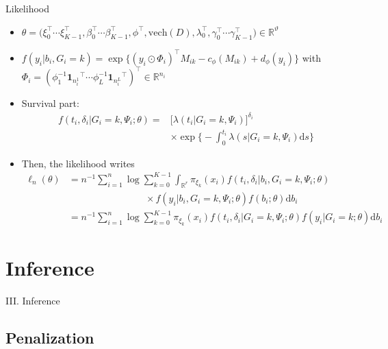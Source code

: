 \documentclass{beamer}
\newcommand{\dd}{\mathrm{d}}
\newcommand{\R}{\mathbb R}
\begin{document}
\begin{frame}{Likelihood}

\footnotesize
\begin{itemize}
  \item<1-> \scriptsize $\theta = \big(\xi_0^\top \cdots \xi_{K-1}^\top, \beta_0^\top \cdots \beta_{K-1}^\top, \phi^\top, \text{vech}(D), \lambda_0^\top, \gamma_0^\top \cdots \gamma_{K-1}^\top\big) \in \R^\vartheta$
  \item<2-> $f(y_i|b_i, G_i=k) = \exp \big\{(y_i \odot \Phi_i)^\top M_{ik} - c_\phi(M_{ik}) + d_\phi(y_i) \big\}$ with $\Phi_i = (\phi_1^{-1} {\textbf{1}_{n_i^1}}^\top \cdots \phi_L^{-1} {\textbf{1}_{n_i^L}}^\top)^\top \in \R^{n_i}$
  \item<3-> Survival part:
  \begin{align*}f(t_i, \delta_i| G_i = k, \Psi_i ; \theta) = &\big[\lambda(t_i| G_i = k, \Psi_i)\big]^{\delta_i} \\ & \times \exp \Big\{-\int_0^{t_i} \lambda(s| G_i = k, \Psi_i) \dd s \Big\}
  \end{align*}
  \item<4-> Then, the likelihood writes
  \begin{align*}
  \ell_n(\theta) &= n^{-1} \sum_{i=1}^n \log \sum_{k=0}^{K-1} \int_{\R^r} \pi_{\xi_k}(x_i) f(t_i, \delta_i| b_i, G_i = k, \Psi_i ; \theta) \\ & \qquad\qquad\qquad\qquad \times f(y_i | b_i, G_i = k, \Psi_i; \theta) f(b_i ; \theta) \dd b_i \\
  &= n^{-1} \sum_{i=1}^n \log \sum_{k=0}^{K-1} \pi_{\xi_k}(x_i) f(t_i, \delta_i| G_i = k, \Psi_i ; \theta) f(y_i | G_i = k; \theta) \dd b_i
  \end{align*}
\end{itemize}

\end{frame}

\section{Inference}

\begin{frame}[noframenumbering]
\Large \centering
\textcolor{blue_pres}{III.} Inference
\end{frame}

\subsection{Penalization}
\end{document}

